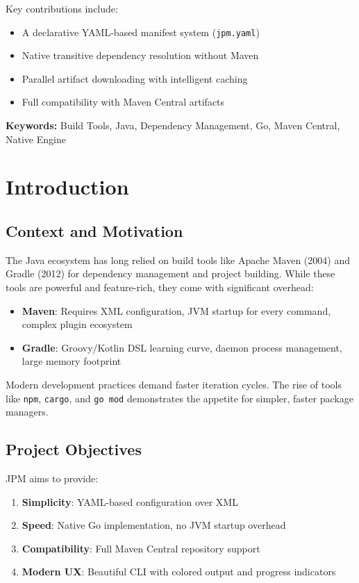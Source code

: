 \documentclass[12pt,a4paper]{report}
\begin{document}
Key contributions include:
\begin{itemize}
    \item A declarative YAML-based manifest system (\texttt{jpm.yaml})
    \item Native transitive dependency resolution without Maven
    \item Parallel artifact downloading with intelligent caching
    \item Full compatibility with Maven Central artifacts
\end{itemize}

\vspace{1cm}
\textbf{Keywords:} Build Tools, Java, Dependency Management, Go, Maven Central, Native Engine

\newpage

\chapter{Introduction}

\section{Context and Motivation}

The Java ecosystem has long relied on build tools like Apache Maven (2004) and Gradle (2012) for dependency management and project building. While these tools are powerful and feature-rich, they come with significant overhead:

\begin{itemize}
    \item \textbf{Maven}: Requires XML configuration, JVM startup for every command, complex plugin ecosystem
    \item \textbf{Gradle}: Groovy/Kotlin DSL learning curve, daemon process management, large memory footprint
\end{itemize}

Modern development practices demand faster iteration cycles. The rise of tools like \texttt{npm}, \texttt{cargo}, and \texttt{go mod} demonstrates the appetite for simpler, faster package managers.

\section{Project Objectives}

JPM aims to provide:

\begin{enumerate}
    \item \textbf{Simplicity}: YAML-based configuration over XML
    \item \textbf{Speed}: Native Go implementation, no JVM startup overhead
    \item \textbf{Compatibility}: Full Maven Central repository support
    \item \textbf{Modern UX}: Beautiful CLI with colored output and progress indicators
\end{enumerate}
\end{document}
